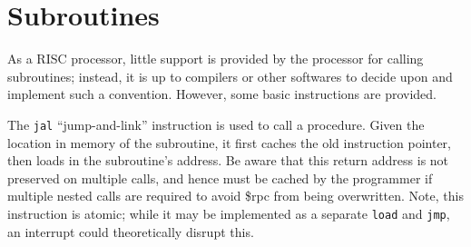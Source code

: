 \documentclass[10pt]{article}
\begin{document}
%
%
%
%
%
%
%
%

    \section{Subroutines}\label{sec:subroutines}

    As a RISC processor, little support is provided by the processor for calling subroutines;
    instead, it is up to compilers or other softwares to decide upon and implement such a convention.
    However, some basic instructions are provided.

    The \texttt{jal} ``jump-and-link'' instruction is used to call a procedure.
    Given the location in memory of the subroutine, it first caches the old instruction pointer, then loads in the subroutine's address.
    Be aware that this return address is not preserved on multiple calls, and hence must be cached by the programmer if multiple nested calls are required to avoid \$rpc from being overwritten.
    Note, this instruction is atomic; while it may be implemented as a separate \texttt{load} and \texttt{jmp}, an interrupt could theoretically disrupt this.
\end{document}
